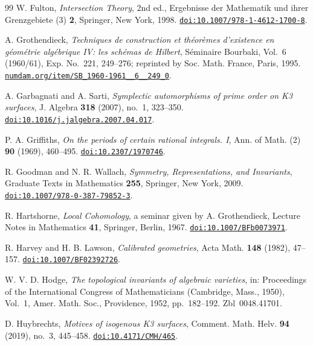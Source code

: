 \begin{thebibliography}{99}
W. Fulton,
\emph{Intersection Theory}, 2nd ed.,
Ergebnisse der Mathematik und ihrer Grenzgebiete (3) \textbf{2},
Springer, New York, 1998.
\href{https://doi.org/10.1007/978-1-4612-1700-8}{\nolinkurl{doi:10.1007/978-1-4612-1700-8}}.

A. Grothendieck,
\emph{Techniques de construction et th\'eor\`emes d'existence en g\'eom\'etrie
alg\'ebrique IV: les sch\'emas de Hilbert},
S\'eminaire Bourbaki, Vol.~6 (1960/61), Exp. No.~221, 249--276;
reprinted by Soc. Math. France, Paris, 1995.
\href{http://www.numdam.org/item/SB_1960-1961__6__249_0/}{\nolinkurl{numdam.org/item/SB_1960-1961__6__249_0}}.

A. Garbagnati and A. Sarti,
\emph{Symplectic automorphisms of prime order on K3 surfaces},
J. Algebra \textbf{318} (2007), no.~1, 323--350.
\href{https://doi.org/10.1016/j.jalgebra.2007.04.017}{\nolinkurl{doi:10.1016/j.jalgebra.2007.04.017}}.

P. A. Griffiths,
\emph{On the periods of certain rational integrals. I},
Ann. of Math. (2) \textbf{90} (1969), 460--495.
\href{https://doi.org/10.2307/1970746}{\nolinkurl{doi:10.2307/1970746}}.

R. Goodman and N. R. Wallach,
\emph{Symmetry, Representations, and Invariants},
Graduate Texts in Mathematics \textbf{255}, Springer, New York, 2009.
\href{https://doi.org/10.1007/978-0-387-79852-3}{\nolinkurl{doi:10.1007/978-0-387-79852-3}}.

R. Hartshorne,
\emph{Local Cohomology}, a seminar given by A. Grothendieck,
Lecture Notes in Mathematics \textbf{41}, Springer, Berlin, 1967.
\href{https://doi.org/10.1007/BFb0073971}{\nolinkurl{doi:10.1007/BFb0073971}}.

R. Harvey and H. B. Lawson,
\emph{Calibrated geometries},
Acta Math. \textbf{148} (1982), 47--157.
\href{https://doi.org/10.1007/BF02392726}{\nolinkurl{doi:10.1007/BF02392726}}.

W. V. D. Hodge,
\emph{The topological invariants of algebraic varieties},
in: Proceedings of the International Congress of Mathematicians (Cambridge, Mass., 1950), Vol.~1,
Amer. Math. Soc., Providence, 1952, pp.~182--192. Zbl~0048.41701.

D. Huybrechts,
\emph{Motives of isogenous K3 surfaces},
Comment. Math. Helv. \textbf{94} (2019), no.~3, 445--458.
\href{https://doi.org/10.4171/CMH/465}{\nolinkurl{doi:10.4171/CMH/465}}.


\end{thebibliography}
